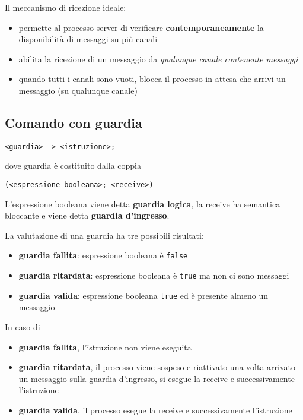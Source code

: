 Il meccanismo di ricezione ideale:
\begin{itemize}
    \item permette al processo server di verificare \textbf{contemporaneamente} la disponibilità di messaggi su più canali
    \item abilita la ricezione di un messaggio da \textit{qualunque canale contenente messaggi}
    \item quando tutti i canali sono vuoti, blocca il processo in attesa che arrivi un messaggio (su qualunque canale)
\end{itemize}

\subsection{Comando con guardia}
\begin{verbatim}
<guardia> -> <istruzione>;
\end{verbatim}
dove guardia è costituito dalla coppia
\begin{verbatim}
(<espressione booleana>; <receive>)
\end{verbatim}

L'espressione booleana viene detta \textbf{guardia logica}, la receive ha semantica bloccante e viene detta \textbf{guardia d'ingresso}.

La valutazione di una guardia ha tre possibili risultati:
\begin{itemize}
    \item \textbf{guardia fallita}: espressione booleana è \texttt{false}
    \item \textbf{guardia ritardata}: espressione booleana è \texttt{true} ma non ci sono messaggi
    \item \textbf{guardia valida}: espressione booleana \texttt{true} ed è presente almeno un messaggio
\end{itemize}

In caso di
\begin{itemize}
    \item \textbf{guardia fallita}, l'istruzione non viene eseguita
    \item \textbf{guardia ritardata}, il processo viene sospeso e riattivato una volta arrivato un messaggio sulla guardia d'ingresso, si esegue la receive e successivamente l'istruzione
    \item \textbf{guardia valida}, il processo esegue la receive e successivamente l'istruzione
\end{itemize}

